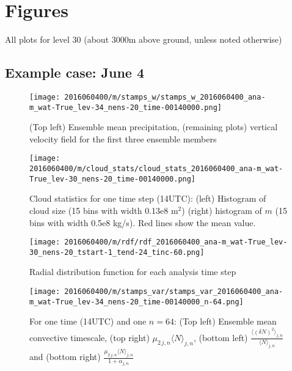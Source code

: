 \documentclass[a4paper, 12pt]{article}
\begin{document}
\newpage

{\small
 }

\newpage
\section{Figures}
All plots for level 30 (about 3000m above ground, unless noted otherwise)

\subsection{Example case: June 4}
\begin{figure}[ht] \label{fig:ex_stamps_w}
\noindent \centering
\texttt{[image: 2016060400/m/stamps\_w/stamps\_w\_2016060400\_ana-m\_wat-True\_lev-34\_nens-20\_time-00140000.png]}\\
\caption{(Top left) Ensemble mean precipitation, (remaining plots) vertical velocity field for the first three ensemble members}
\end{figure}

\begin{figure}[ht] \label{fig:ex_cloud_stats}
\noindent \centering
\texttt{[image: 2016060400/m/cloud\_stats/cloud\_stats\_2016060400\_ana-m\_wat-True\_lev-30\_nens-20\_time-00140000.png]}\\
\caption{Cloud statistics for one time step (14UTC): (left) Histogram of cloud size (15 bins with width 0.13e8 m$^2$) (right) histogram of $m$ (15 bins with width 0.5e8 kg/s). Red lines show the mean value.}
\end{figure}

\begin{figure}[ht] \label{fig:ex_rdf}
\noindent \centering
\texttt{[image: 2016060400/m/rdf/rdf\_2016060400\_ana-m\_wat-True\_lev-30\_nens-20\_tstart-1\_tend-24\_tinc-60.png]}\\
\caption{Radial distribution function for each analysis time step}
\end{figure}

\begin{figure}[ht] \label{fig:ex_stamps_var}
\noindent \centering
\texttt{[image: 2016060400/m/stamps\_var/stamps\_var\_2016060400\_ana-m\_wat-True\_lev-34\_nens-20\_time-00140000\_n-64.png]}\\
\caption{For one time (14UTC) and one $n=64$: (Top left) Ensemble mean convective timescale, (top right) $\mu_{2\,j,n}\langle N \rangle_{j,n}$, (bottom left) $\frac{\langle (\delta N)^2 \rangle_{j,n}}{\langle N \rangle_{j,n}}$ and (bottom right) $\frac{\mu_{2\,j,n}\langle N\rangle_{j,n}}{1 + \alpha_{j,n}}$}
\end{figure}
\end{document}
